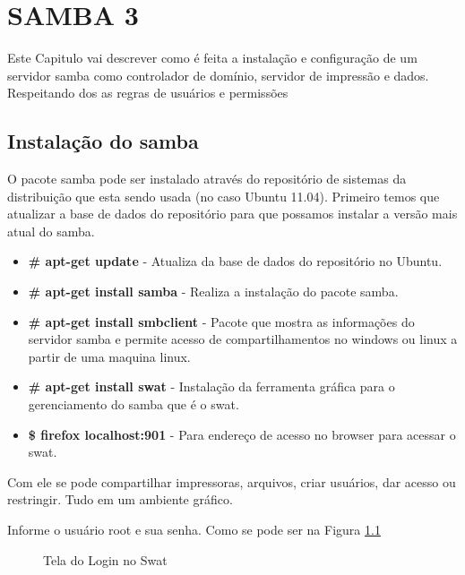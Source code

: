\chapter{SAMBA 3}
Este Capitulo vai descrever como é feita a instalação e configuração de um servidor samba como controlador de domínio, servidor de impressão e dados. Respeitando dos as regras de usuários e permissões

\section{Instalação do samba}

O pacote samba pode ser instalado através do repositório de sistemas da distribuição que esta sendo usada (no caso Ubuntu 11.04). Primeiro temos que atualizar a base de dados do repositório para que possamos instalar a versão mais atual do samba.

\begin{itemize}
    \item \textbf{\# apt-get update} - Atualiza da base de dados do repositório no Ubuntu.
    \item \textbf{\# apt-get install samba} - Realiza a instalação do pacote samba.
    \item \textbf{\# apt-get install smbclient} - Pacote que mostra as informações do servidor samba e permite acesso de compartilhamentos no windows ou linux a partir de uma maquina linux.
    \item \textbf{\# apt-get install swat} - Instalação da ferramenta gráfica para o gerenciamento do samba que é o swat.
    \item \textbf{\$ firefox localhost:901} - Para endereço de acesso no browser para acessar o swat.
\end{itemize}

Com ele se pode compartilhar impressoras, arquivos, criar usuários, dar acesso ou restringir. Tudo em um ambiente gráfico.

Informe o usuário root e sua senha. Como se pode ser na Figura \ref{swat_login}

\begin{figure}[hp]
   	\centering
   	\caption{Tela do Login no Swat}
    \label{swat_login}
\end{figure}

